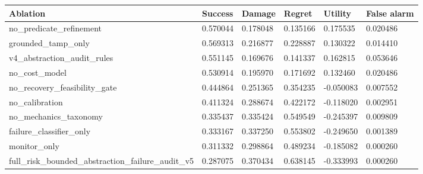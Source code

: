 \begin{tabular}{llllll}
\toprule
Ablation & Success & Damage & Regret & Utility & False alarm \\
\midrule
no\_predicate\_refinement & 0.570044 & 0.178048 & 0.135166 & 0.175535 & 0.020486 \\
grounded\_tamp\_only & 0.569313 & 0.216877 & 0.228887 & 0.130322 & 0.014410 \\
v4\_abstraction\_audit\_rules & 0.551145 & 0.169676 & 0.141337 & 0.162815 & 0.053646 \\
no\_cost\_model & 0.530914 & 0.195970 & 0.171692 & 0.132460 & 0.020486 \\
no\_recovery\_feasibility\_gate & 0.444864 & 0.251365 & 0.354235 & -0.050083 & 0.007552 \\
no\_calibration & 0.411324 & 0.288674 & 0.422172 & -0.118020 & 0.002951 \\
no\_mechanics\_taxonomy & 0.335437 & 0.335424 & 0.549549 & -0.245397 & 0.009809 \\
failure\_classifier\_only & 0.333167 & 0.337250 & 0.553802 & -0.249650 & 0.001389 \\
monitor\_only & 0.311332 & 0.298864 & 0.489234 & -0.185082 & 0.000260 \\
full\_risk\_bounded\_abstraction\_failure\_audit\_v5 & 0.287075 & 0.370434 & 0.638145 & -0.333993 & 0.000260 \\
\bottomrule
\end{tabular}
